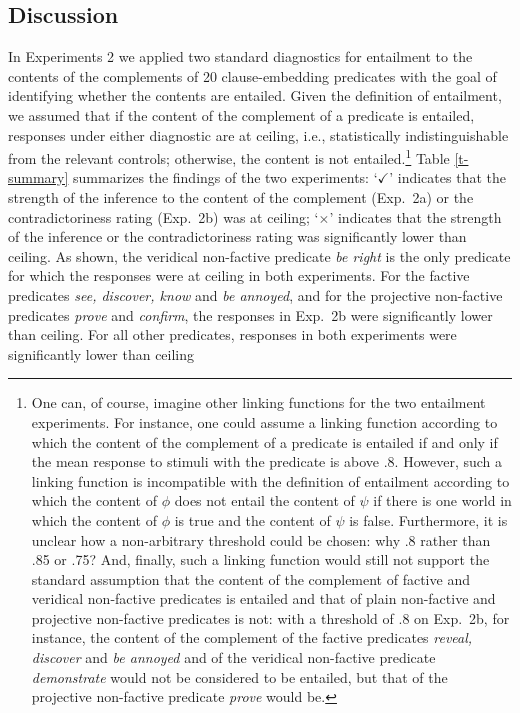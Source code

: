 \documentclass[11pt,fleqn]{article}
\newcommand{\6}{\mbox{$[\hspace*{-.6mm}[$}}
\newcommand{\9}{\mbox{$]\hspace*{-.6mm}]$}}
\begin{document}
{\subsection{Discussion}\label{s33}

In Experiments 2 we applied two standard diagnostics for entailment to the contents of the complements of 20 clause-embedding predicates with the goal of identifying whether the contents are entailed. Given the definition of entailment, we assumed that if the content of the complement of a predicate is entailed, responses under either diagnostic are at ceiling, i.e., statistically indistinguishable from the relevant controls; otherwise, the content is not entailed.\footnote{One can, of course, imagine other linking functions for the two entailment experiments. For instance, one could assume a linking function according to which the content of the complement of a predicate is entailed if and only if the mean response to stimuli with the predicate is above .8. However, such a linking function is incompatible with the definition of entailment according to which the content of $\phi$ does not entail the content of $\psi$ if there is one world in which the content of $\phi$ is true and the content of $\psi$ is false. Furthermore, it is unclear how a non-arbitrary threshold could be chosen: why .8 rather than .85 or .75? And, finally, such a linking function would still not support the standard assumption that the content of the complement of factive and veridical non-factive predicates is entailed and that of plain non-factive and projective non-factive predicates is not: with a threshold of .8 on Exp.~2b, for instance, the content of the complement of the factive predicates {\em reveal, discover} and {\em be annoyed} and of the veridical non-factive predicate {\em demonstrate} would not be considered to be entailed, but that of the projective non-factive predicate {\em prove} would be.} Table \ref{t-summary} summarizes the findings of the two experiments: `$\checkmark$' indicates that the strength of the inference to the content of the complement (Exp.~2a) or the contradictoriness rating (Exp.~2b) was at ceiling; `$\times$' indicates that the strength of the inference or the contradictoriness rating was significantly lower than ceiling. As shown, the veridical non-factive predicate {\em be right} is the only predicate for which the responses were at ceiling in both experiments. For the factive predicates {\em see, discover, know} and {\em be annoyed}, and for the projective non-factive predicates {\em prove} and {\em confirm}, the responses in Exp.~2b were significantly lower than ceiling. For all other predicates, responses in both experiments were significantly lower than ceiling


}
\end{document}
